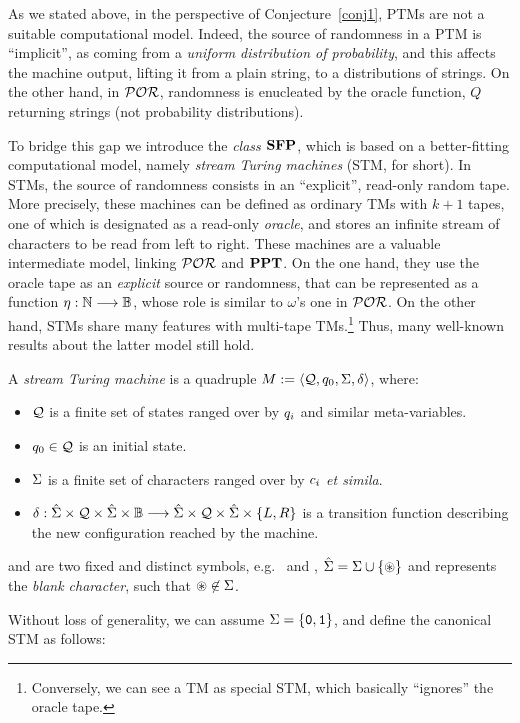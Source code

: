 \noindent
As we stated above, in the perspective of
Conjecture~\ref{conj1}, PTMs are not a suitable
computational model.
Indeed, the source of randomness in a PTM is ``implicit'',
as coming from a \emph{uniform distribution of
probability}, and this affects the machine
output, lifting it from a plain string, to a
distributions of strings.
%
On the other hand, in $\mathcal{POR}$,
randomness is enucleated by the oracle function,
$Q$
returning strings (not probability distributions).


To bridge this gap %
we introduce the \emph{class $\mathbf{SFP}$},
which is based on
a better-fitting computational model,
namely \emph{stream Turing machines}
(STM, for short).
%
In STMs, the source of randomness
consists in an ``explicit'', read-only
random tape.
%
More precisely, these machines can be defined
as ordinary
TMs with $k+1$ tapes,
one of which is designated as a read-only \emph{oracle},
and stores an infinite stream of characters to
be read from left to right.
%
These machines are a valuable intermediate
model, linking $\mathcal{POR}$ and $\mathbf{PPT}$.
%
On the one hand, they use the oracle tape as an \emph{explicit}
source or randomness,
that can be represented
as a function $\eta:\mathbb{N} \longrightarrow \mathbb{B}$,
whose role
is similar to $\omega$'s one in $\mathcal{POR}$.
%
On the other hand, STMs share many features with
multi-tape TMs.\footnote{Conversely,
we can see
a TM as special STM, which basically ``ignores'' the
oracle tape.}
%
Thus, many well-known results
about the latter model still hold.
%



\begin{defn}\label{df:streamMachine}
A \emph{stream Turing machine} is a quadruple
$M:= \langle \textcolor{black}{\mathcal{Q}}, \textcolor{black}{q_0}, \textcolor{black}{\Sigma}, \textcolor{black}{\delta} \rangle$, where:
\begin{itemize}
\itemsep0em
\item $\textcolor{black}{\mathcal{Q}}$ is a finite set of states ranged over by
$\textcolor{black}{q_i}$ and similar meta-variables.
%
\item $\textcolor{black}{q_0} \in \textcolor{black}{\mathcal{Q}}$ is an initial state.
%
\item $\textcolor{black}{\Sigma}$ is a finite set of characters
ranged over by $\textcolor{black}{c_i}$ \emph{et simila}.
%
\item $\textcolor{black}{\delta}: \textcolor{black}{\hat{\Sigma}}
\times \textcolor{black}{\mathcal{Q}} \times \textcolor{black}{{\hat{\Sigma}}} \times
\mathbb{B}
\longrightarrow \textcolor{black}{\hat{\Sigma}} \times \textcolor{black}{\mathcal{Q}} \times \textcolor{black}{\hat{\Sigma}} \times \{\textcolor{black}{L},\textcolor{black}{R}\}$
is a transition function describing the new configuration
reached by the machine.
\end{itemize}
 and  are two fixed and distinct symbols,
e.g.~\m{$\zero$} and \m{$\one$},
$\textcolor{black}{\hat{\Sigma}}=\textcolor{black}{\Sigma} \cup \{\textcolor{black}{\circledast}\}$
and \m{$\blank$} represents the
\emph{blank character}, such that $\textcolor{black}{\circledast} \not \in
\textcolor{black}{\Sigma}$.
\end{defn}
%
\noindent
Without loss of generality,
we can assume
$\textcolor{black}{\Sigma}=\{\textcolor{black}{\mathtt{0}}, \textcolor{black}{\mathtt{1}}\}$,
and define the canonical STM as follows:




